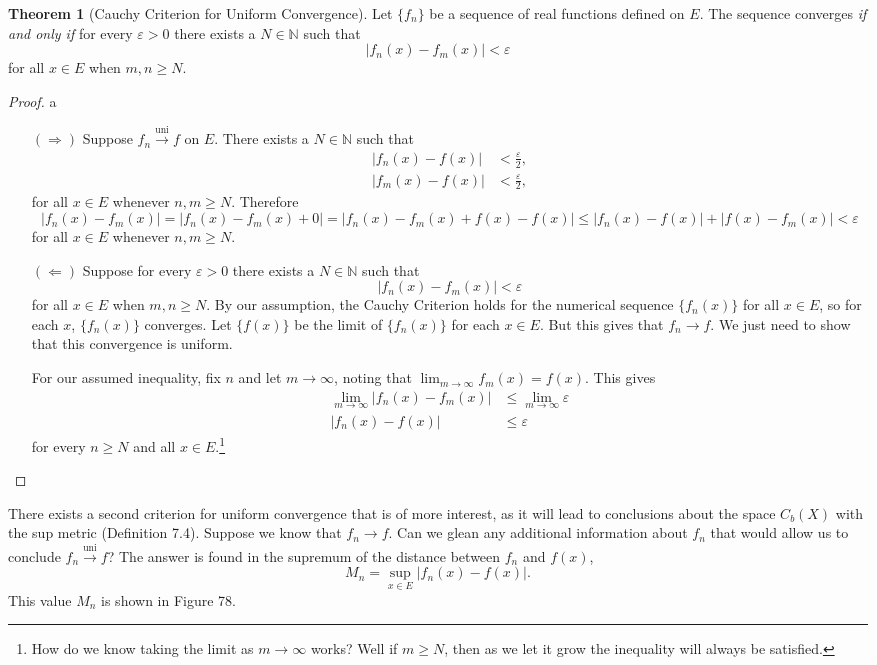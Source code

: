 \documentclass{article}
\newcommand{\N}{\mathbb{N}}
\newcommand{\uni}{\overset{\text{uni}}{\to}}
\theoremstyle{definition}
\newtheorem{theorem}{Theorem}[section]
\begin{document}
	\begin{theorem}[Cauchy Criterion for Uniform Convergence]
		Let $ \{f_n\} $ be a sequence of real functions defined on $ E $. The sequence converges \textit{if and only if} for every $ \varepsilon>0 $ there exists a $ N\in \N $ such that
		$$|f_n(x)-f_m(x)|<\varepsilon $$ for all $ x\in E $ when $ m,n\ge N $. 
	\end{theorem}
	\begin{proof}{\color{white}a}
		\begin{enumerate}
			\item [$ (\Longrightarrow) $] Suppose $ f_n\uni f $ on $ E $. There exists a $ N\in\N $ such that \begin{align*}
				|f_n(x)-f(x)|&<\frac{\varepsilon}{2},\\
				|f_m(x)-f(x)|&<\frac{\varepsilon}{2},
			\end{align*}
			for all $ x\in E $ whenever $ n,m\ge N $. Therefore $$|f_n(x)-f_m(x)|=|f_n(x)-f_m(x)+0|=|f_n(x)-f_m(x)+f(x)-f(x)|\le |f_n(x)-f(x)|+|f(x)-f_m(x)|<\varepsilon $$ for all $ x\in E $ whenever $ n,m\ge N $. 
			\item [$ (\Longleftarrow) $]  Suppose for every $ \varepsilon>0 $ there exists a $ N\in \N $ such that
			$$|f_n(x)-f_m(x)|<\varepsilon $$ for all $ x\in E $ when $ m,n\ge N $. By our assumption, the Cauchy Criterion holds for the numerical sequence $ \{f_n(x)\} $ for all $ x\in E $, so for each $ x $, $ \{f_n(x)\} $ converges. Let $ \{f(x)\} $ be the limit of $ \{f_n(x)\} $ for each $ x\in E $. But this gives that $ f_n\to f $. We just need to show that this convergence is uniform. 
			
			For our assumed inequality, fix $ n $ and let $ m\to \infty $, noting that $ \lim_{m\to \infty}f_m(x)=f(x) $. This gives 
			\begin{align*}
				\lim_{m\to\infty}|f_n(x)-f_m(x)|&\le \lim_{m\to\infty}\varepsilon\\
				|f_n(x)-f(x)|&\le \varepsilon
			\end{align*}
			for every $ n\ge N $ and all $ x\in E $.\footnote{How do we know taking the limit as $ m\to\infty $ works? Well if $ m\ge N $, then as we let it grow the inequality will always be satisfied. }
		\end{enumerate}
	\end{proof}
	There exists a second criterion for uniform convergence that is of more interest, as it will lead to conclusions about the space $ C_b(X) $ with the sup metric (Definition 7.4). Suppose we know that $ f_n\to f $. Can we glean any additional information about $ f_n $ that would allow us to conclude $ f_n\uni f $? The answer is found in the supremum of the distance between $ f_n $ and $ f(x) $, $$M_n=\sup_{x\in E}|f_n(x)-f(x)| .$$ This value $ M_n $ is shown in Figure 78. 
\end{document}
